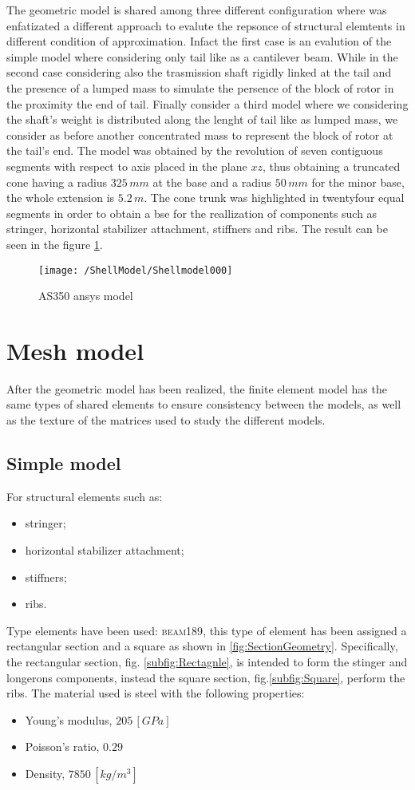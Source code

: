 The geometric model is shared among three different configuration where was enfatizated a different approach to evalute the repsonce of structural elemtents in different condition of approximation. Infact the first case is an evalution of the simple model where considering only tail like as a cantilever beam. 
While in the second case considering also the trasmission shaft rigidly linked at the tail and the presence of a lumped mass to simulate the persence of the block of rotor in the proximity the end of tail. 
Finally consider a third model where we considering the shaft's weight is distributed along the lenght of tail like as lumped mass, we consider as before another concentrated mass to represent the block of rotor at the tail's end.
The model was obtained by the revolution of seven contiguous segments with respect to axis placed in the plane $xz$, thus obtaining a truncated cone having a radius $325\,mm$ at the base and a radius $50\,mm$ for the minor base, the whole extension is $5.2\,m$.
The cone trunk was highlighted in twentyfour equal segments in order to obtain a bse for the reallization of components such as stringer, horizontal stabilizer attachment, stiffners and ribs.
The result can be seen in the figure \ref{fig:Ansys1}.

\begin{figure}[htb]
\centering
\texttt{[image: /ShellModel/Shellmodel000]}
\caption{AS350 ansys model}
\label{fig:Ansys1}
\end{figure}

\section{Mesh model}
After the geometric model has been realized, the finite element model has the same types of shared elements to ensure consistency between the models, as well as the texture of the matrices used to study the different models.
\subsection{Simple model}
For structural elements such as:
\begin{itemize}
\item stringer;
\item horizontal stabilizer attachment;
\item stiffners;
\item ribs.
\end{itemize}
Type elements have been used: \textsc{beam189}, this type of element has been assigned a rectangular section and a square as shown in \ref{fig:SectionGeometry}. Specifically, the rectangular section, fig. \ref{subfig:Rectagnle}, is intended to form the stinger and longerons components, instead the square section, fig.\ref{subfig:Square}, perform the ribs.
The material used is steel with the following properties:
\begin{itemize}
\item Young's modulus, $205\,[GPa]$ 
\item Poisson's ratio, $0.29$
\item Density, $7850	\,[kg/m^3]$
\end{itemize}

